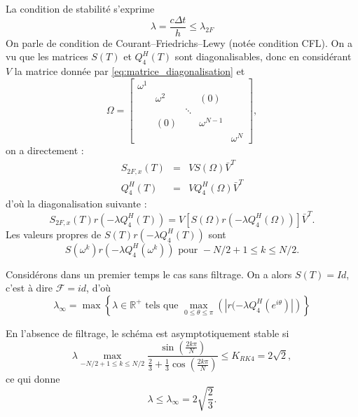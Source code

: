 La condition de stabilité s'exprime 
\begin{equation}
\lambda = \dfrac{c \Delta t}{h} \leq \lambda_{2F}
\end{equation}
On parle de condition de Courant–Friedrichs–Lewy \cite{Courant1928} (notée condition CFL). On a vu que les matrices $S(T)$ et $Q_4^H(T)$ sont diagonalisables, donc en considérant $V$ la matrice donnée par \eqref{eq:matrice_diagonalisation} et
\begin{equation}
\Omega = \begin{bmatrix}
\omega^1 &   &   &   &   \\ 
  & \omega^2 &   & (0) &   \\ 
  &   & \ddots &   &   \\ 
  & (0) &   & \omega^{N-1} &   \\ 
  &   &   &   & \omega^N
\end{bmatrix},
\end{equation}
on a directement :
\begin{equation}
\begin{array}{rcl}
S_{2F,x}(T) & = & V S(\Omega) \bar{V}^T \\
Q_4^H(T) & = & V Q_4^H(\Omega) \bar{V}^T
\end{array}
\end{equation}
d'où la diagonalisation suivante :
\begin{equation}
S_{2F,x}(T)r(-\lambda Q_4^H(T)) = V \left[ S(\Omega)r(-\lambda Q_4^H(\Omega)) \right] \bar{V}^T.
\end{equation}
Les valeurs propres de $S(T)r(-\lambda Q_4^H(T))$ sont
\begin{equation}
S(\omega^k)r(-\lambda Q_4^H(\omega^k))  \text{ pour } -N/2+1 \leq k \leq N/2. 
\end{equation}


Considérons dans un premier temps le cas sans filtrage. On a alors $S(T) = Id$, c'est à dire $\mathcal{F} = id$, d'où
\begin{equation}
\lambda_{\infty} = \max \left\lbrace \lambda \in \mathbb{R}^+ \text{ tels que } \max_{0 \leq \theta \leq \pi} \left( | r(-\lambda Q_4^H(e^{i \theta}) | \right) \right\rbrace
\end{equation}

\begin{theoreme}
En l'absence de filtrage, le schéma est asymptotiquement stable si 
\begin{equation}
\lambda \max_{-N/2+1 \leq k \leq N/2} \dfrac{\sin \left( \frac{2 k \pi}{N} \right)}{\frac{2}{3} + \frac{1}{3} \cos \left( \frac{2 k \pi}{N} \right)} \leq K_{RK4} = 2 \sqrt{2},
\end{equation}
ce qui donne
\begin{equation}
\lambda \leq \lambda_{\infty} = 2\sqrt{\dfrac{2}{3}}.
\end{equation}
\end{theoreme}

